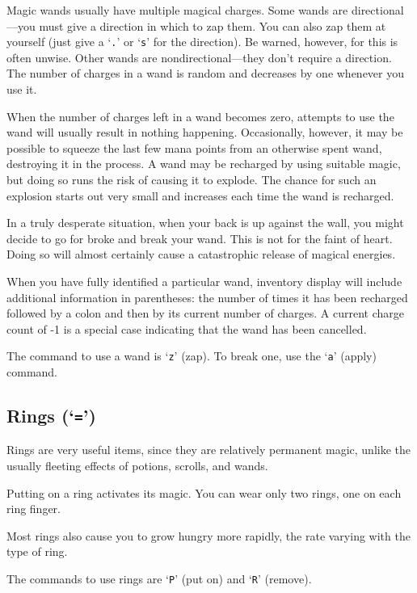 
Magic wands usually have multiple magical charges.  Some wands are
directional---you must give a direction in which to zap them.  You can also
zap them at yourself (just give a `{\tt .}' or `{\tt s}' for the direction). Be warned,
however, for this is often unwise.  Other wands are nondirectional---they
don't require a direction.  The number of charges in a wand is random and
decreases by one whenever you use it.

When the number of charges left in a wand becomes zero, attempts to use the
wand will usually result in nothing happening.  Occasionally, however, it may
be possible to squeeze the last few mana points from an otherwise spent wand,
destroying it in the process.  A wand may be recharged by using suitable
magic, but doing so runs the risk of causing it to explode.  The chance
for such an explosion starts out very small and increases each time the
wand is recharged.

In a truly desperate situation, when your back is up against the wall, you
might decide to go for broke and break your wand.  This is not for the faint
of heart.  Doing so will almost certainly cause a catastrophic release of
magical energies.

When you have fully identified a particular wand, inventory display will
include additional information in parentheses: the number of times it has
been recharged followed by a colon and then by its current number of charges.
A current charge count of -1 is a special case indicating that the wand
has been cancelled.

The command to use a wand is `{\tt z}' (zap).  To break one, use the `{\tt a}' (apply)
command.
\subsection*{Rings (`{\tt =}')}


Rings are very useful items, since they are relatively permanent
magic, unlike the usually fleeting effects of potions, scrolls, and
wands.

Putting on a ring activates its magic.  You can wear only two
rings, one on each ring finger.

Most rings also cause you to grow hungry more rapidly, the rate
varying with the type of ring.  

The commands to use rings are `{\tt P}' (put on) and `{\tt R}' (remove).
